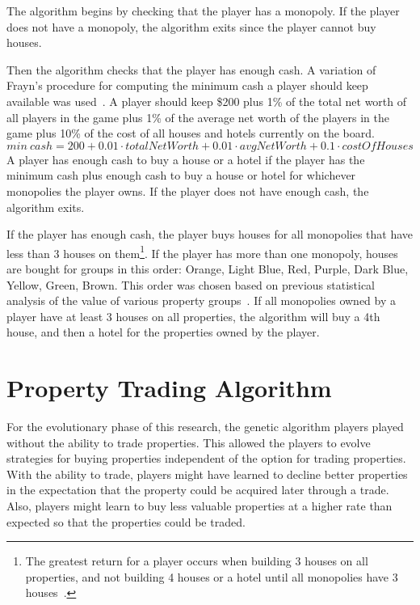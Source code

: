The algorithm begins by checking that the player has a monopoly. If the player
does not have a monopoly, the algorithm exits since the player cannot buy
houses.

Then the algorithm checks that the player has enough cash. A variation of
Frayn's procedure for computing the minimum cash a player should keep available
was used~\cite{DBLP:conf/cig/Frayn05}. A player should keep \$200 plus 1\% of
the total net worth of all players in the game plus 1\% of the average net worth
of the players in the game plus 10\% of the cost of all houses and hotels
currently on the board.
\begin{equation*}
min~cash = 200 + 0.01 \cdot totalNetWorth + 0.01 \cdot avgNetWorth + 0.1 \cdot
costOfHouses
\end{equation*}
A player has enough cash to buy a house or a hotel if the player has the minimum
cash plus enough cash to buy a house or hotel for whichever monopolies the
player owns. If the player does not have enough cash, the algorithm exits.

If the player has enough cash, the player buys houses for all monopolies
that have less than 3 houses on them\footnote{The greatest return for a player
occurs when building 3 houses on all properties, and not building 4 houses or a
hotel until all monopolies have 3 houses~\cite{orbanes2007monopoly}.}. If the
player has more than one monopoly, houses are bought for groups in this order:
Orange, Light Blue, Red, Purple, Dark Blue, Yellow, Green, Brown. This order was
chosen based on previous statistical analysis of the value of various property
groups~\cite{Ash1972,Abbott1997,DBLP:conf/cig/Frayn05}. If all monopolies owned
by a player have at least 3 houses on all properties, the algorithm will buy a
4th house, and then a hotel for the properties owned by the player.

\section{Property Trading Algorithm} \label{5_trade_property}

For the evolutionary phase of this research, the genetic algorithm players
played without the ability to trade properties. This allowed the players to
evolve strategies for buying properties independent of the option for trading
properties. With the ability to trade, players might have learned to decline
better properties in the expectation that the property could be acquired later
through a trade. Also, players might learn to buy less valuable properties at a
higher rate than expected so that the properties could be traded.

